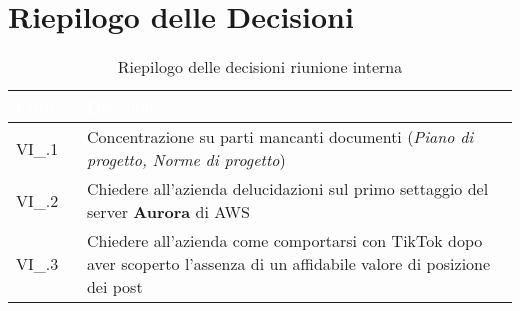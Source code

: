 \section{Riepilogo delle Decisioni}


\begin{table}[!htbp]
\renewcommand{\arraystretch}{1.5}
\begin{tabular}{m{}<{\centering}  m{}<{\centering}}
\rowcolor{darkblue} \textcolor{white}{\textbf{Codice}} & \textcolor{white}{\textbf{Decisione}} \\
\hline
VI\_{}\D{}.1 & Concentrazione su parti mancanti documenti (\textit{Piano di progetto, Norme di progetto})\\
VI\_{}\D{}.2 & Chiedere all'azienda delucidazioni sul primo settaggio del server \textbf{Aurora} di AWS \\
VI\_{}\D{}.3 & Chiedere all'azienda come comportarsi con TikTok dopo aver scoperto l'assenza di un affidabile valore di posizione dei post\\
\end{tabular}
\caption{Riepilogo delle decisioni riunione interna \D}
\end{table}